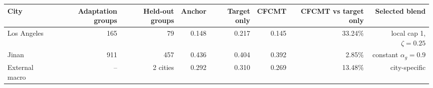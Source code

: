 \begin{tabular}{lrrrrrrr}
\toprule
City & Adaptation groups & Held-out groups & Anchor & Target only & CFCMT & CFCMT vs target only & Selected blend \\
\midrule
Los Angeles & 165 & 79 & 0.148 & 0.217 & 0.145 & 33.24\% & local cap 1, $\zeta=0.25$ \\
Jinan & 911 & 457 & 0.436 & 0.404 & 0.392 & 2.85\% & constant $\alpha_g=0.9$ \\
\midrule
External macro & -- & 2 cities & 0.292 & 0.310 & 0.269 & 13.48\% & city-specific \\
\bottomrule
\end{tabular}
